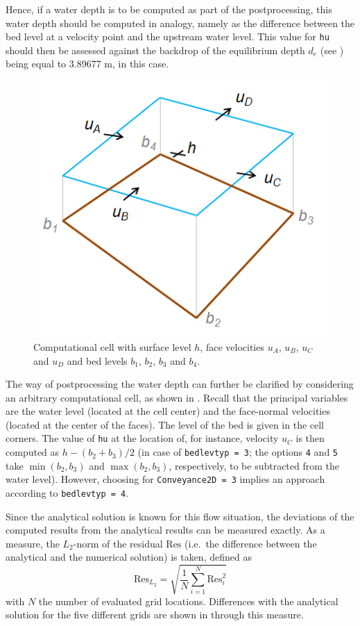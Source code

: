 Hence, if a water depth is to be computed as part of the postprocessing, this water depth should be computed in analogy, namely as the difference between the bed level at a velocity point and the upstream water level. This value for \texttt{hu} should then be assessed against the backdrop of the equilibrium depth $d_e$ (see ) being equal to 3.89677 m, in this case. 

\begin{figure}[h!]
\begin{center}
\includegraphics[width=0.5\columnwidth]{figures/computationalcell.png}
\end{center}\caption{Computational cell with surface level $h$, face velocities $u_A$, $u_B$, $u_C$ and $u_D$ and bed levels $b_1$, $b_2$, $b_3$ and $b_4$. \label{fig:chezysquarescell}}
\end{figure}

The way of postprocessing the water depth can further be clarified by considering an arbitrary computational cell, as shown in . Recall that the principal variables are the water level (located at the cell center) and the face-normal velocities (located at the center of the faces). The level of the bed is given in the cell corners. The value of \texttt{hu} at the location of, for instance, velocity $u_C$ is then computed as $h - (b_2 + b_3)/2$ (in case of \texttt{bedlevtyp = 3}; the options \texttt{4} and \texttt{5} take $\min(b_2,b_3)$ and $\max(b_2,b_3)$, respectively, to be subtracted from the water level). However, choosing for \texttt{Conveyance2D = 3} implies an approach according to \texttt{bedlevtyp = 4}.

Since the analytical solution is known for this flow situation, the deviations of the computed results from the analytical results can be measured exactly. As a measure, the $L_2$-norm of the residual $\mathrm{Res}$ (i.e.\ the difference between the analytical and the numerical solution) is taken, defined as
\begin{equation}
\mathrm{Res}_{L_2} = \sqrt{\frac{1}{N} \sum_{i=1}^N \mathrm{Res}_i^2}
\end{equation}
with $N$ the number of evaluated grid locations. Differences with the analytical solution for the five different grids are shown in  through this measure. 

